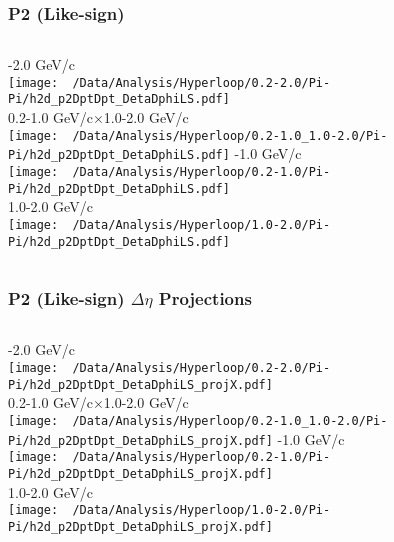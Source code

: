 \documentclass{beamer}
\begin{document}
\begin{frame}
	\frametitle{P2 (Like-sign)}
	\begin{columns}
		-2.0 GeV/c\\
		\texttt{[image: ~/Data/Analysis/Hyperloop/0.2-2.0/Pi-Pi/h2d\_p2DptDpt\_DetaDphiLS.pdf]}\\0.2-1.0 GeV/c$\times$1.0-2.0 GeV/c\\
		\texttt{[image: ~/Data/Analysis/Hyperloop/0.2-1.0\_1.0-2.0/Pi-Pi/h2d\_p2DptDpt\_DetaDphiLS.pdf]}
		-1.0 GeV/c\\
		\texttt{[image: ~/Data/Analysis/Hyperloop/0.2-1.0/Pi-Pi/h2d\_p2DptDpt\_DetaDphiLS.pdf]}\\1.0-2.0 GeV/c\\
		\texttt{[image: ~/Data/Analysis/Hyperloop/1.0-2.0/Pi-Pi/h2d\_p2DptDpt\_DetaDphiLS.pdf]}
	\end{columns}
\end{frame}
\begin{frame}
	\frametitle{P2 (Like-sign) $\Delta\eta$ Projections}
	\begin{columns}
		\column{0.5\textwidth}
		-2.0 GeV/c\\
		\texttt{[image: ~/Data/Analysis/Hyperloop/0.2-2.0/Pi-Pi/h2d\_p2DptDpt\_DetaDphiLS\_projX.pdf]}\\0.2-1.0 GeV/c$\times$1.0-2.0 GeV/c\\
		\texttt{[image: ~/Data/Analysis/Hyperloop/0.2-1.0\_1.0-2.0/Pi-Pi/h2d\_p2DptDpt\_DetaDphiLS\_projX.pdf]}
		\column{0.5\textwidth}
		-1.0 GeV/c\\
		\texttt{[image: ~/Data/Analysis/Hyperloop/0.2-1.0/Pi-Pi/h2d\_p2DptDpt\_DetaDphiLS\_projX.pdf]}\\1.0-2.0 GeV/c\\
		\texttt{[image: ~/Data/Analysis/Hyperloop/1.0-2.0/Pi-Pi/h2d\_p2DptDpt\_DetaDphiLS\_projX.pdf]}
	\end{columns}
\end{frame}
\end{document}
